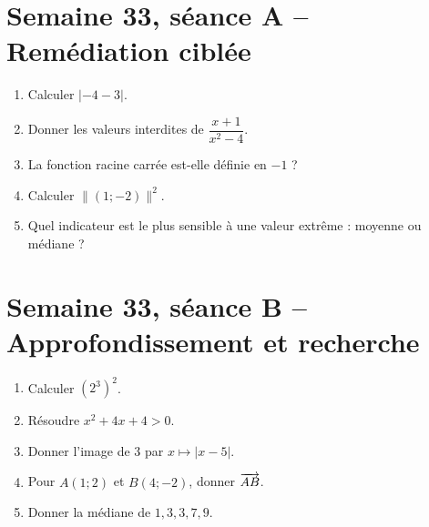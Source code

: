 \section{Semaine 33, séance A -- Remédiation ciblée}
\begin{enumerate}
  \item Calculer $|{-4}-3|$.
  \item Donner les valeurs interdites de $\dfrac{x+1}{x^2-4}$.
  \item La fonction racine carrée est-elle définie en $-1$ ?
  \item Calculer $\|(1;-2)\|^2$.
  \item Quel indicateur est le plus sensible à une valeur extrême : moyenne ou médiane ?
\end{enumerate}

\section{Semaine 33, séance B -- Approfondissement et recherche}
\begin{enumerate}
  \item Calculer $(2^3)^2$.
  \item Résoudre $x^2+4x+4>0$.
  \item Donner l'image de $3$ par $x\mapsto|x-5|$.
  \item Pour $A(1;2)$ et $B(4;-2)$, donner $\overrightarrow{AB}$.
  \item Donner la médiane de $1,3,3,7,9$.
\end{enumerate}

